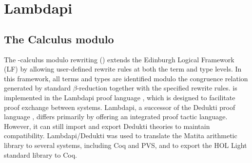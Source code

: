 \chapter{Lambdapi}\label{ch:intro-lambdapi}

\section{The \texorpdfstring{\lp}-Calculus modulo}

The \lp-calculus modulo rewriting (\lpm)  extends the Edinburgh Logical Framework (LF) \cite{lf} by allowing user-defined rewrite rules at both the term and type levels.
In this framework, all terms and types are identified modulo the congruence relation generated by standard $\beta$-reduction together with the specified rewrite rules.
\lpm{}is implemented in the Lambdapi proof language \cite{lambdapi}, which is designed to facilitate proof exchange between systems.
Lambdapi, a successor of the Dedukti proof language \cite{Dedukti-ref, Dedukti-ref2}, differs primarily by offering an integrated proof tactic language.
However, it can still import and export Dedukti theories to maintain compatibility.
Lambdapi/Dedukti was used to translate \cite{thire:tel-03224039} the Matita arithmetic library to several systems, including Coq and PVS, and to export \cite{blanqui:hal-04613926} the HOL Light standard library to Coq.


